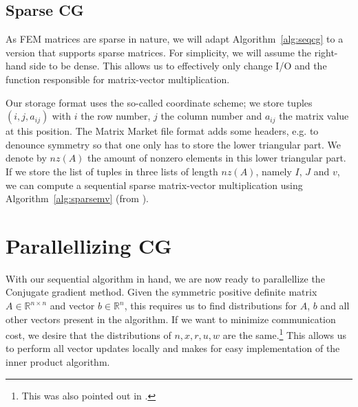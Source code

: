 \documentclass[11pt]{amsart}
\theoremstyle{definition}
\newcommand{\R}{\mathbb{R}}
\begin{document}
\subsection{Sparse CG}
As FEM matrices are sparse in nature, we will adapt Algorithm~\ref{alg:seqcg} to a version that supports sparse matrices. For simplicity, we will assume the right-hand side to be dense. This allows us to effectively only change I/O and the function responsible for matrix-vector multiplication.

Our storage format uses the so-called coordinate scheme; we store tuples $(i, j, a_{ij})$ with $i$ the row number, $j$ the column number and $a_{ij}$ the matrix value at this position. The Matrix Market file format adds some headers, e.g. to denounce symmetry so that one only has to store the lower triangular part. We denote by $nz(A)$ the amount of nonzero elements in this lower triangular part. If we store the list of tuples in three lists of length $nz(A)$, namely $I$, $J$ and $v$, we can compute a sequential sparse matrix-vector multiplication using Algorithm~\ref{alg:sparsemv} (from \cite[Alg.~4.3]{biss04}).



\section{Parallellizing CG}
With our sequential algorithm in hand, we are now ready to parallellize the Conjugate gradient method. Given the symmetric positive definite matrix $A \in \R^{n \times n}$ and vector $b \in \R^n$, this requires us to find distributions for $A$, $b$ and all other vectors present in the algorithm. If we want to minimize communication cost, we desire that the distributions of $n, x, r, u, w$ are the same.\footnote{This was also pointed out in \cite[p.~174]{biss04}.} This allows us to perform all vector updates locally and makes for easy implementation of the inner product algorithm.
\end{document}
